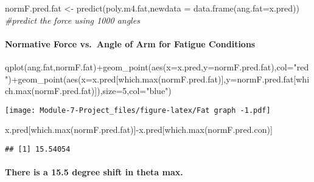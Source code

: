 \documentclass[
]{article}
\newenvironment{Shaded}{\begin{snugshade}}{\end{snugshade}}
\newcommand{\AttributeTok}[1]{\textcolor[rgb]{0.77,0.63,0.00}{#1}}
\newcommand{\CommentTok}[1]{\textcolor[rgb]{0.56,0.35,0.01}{\textit{#1}}}
\newcommand{\DecValTok}[1]{\textcolor[rgb]{0.00,0.00,0.81}{#1}}
\newcommand{\FunctionTok}[1]{\textcolor[rgb]{0.00,0.00,0.00}{#1}}
\newcommand{\NormalTok}[1]{#1}
\newcommand{\OtherTok}[1]{\textcolor[rgb]{0.56,0.35,0.01}{#1}}
\newcommand{\SpecialCharTok}[1]{\textcolor[rgb]{0.00,0.00,0.00}{#1}}
\newcommand{\StringTok}[1]{\textcolor[rgb]{0.31,0.60,0.02}{#1}}
\begin{document}
\begin{Shaded}
\begin{Highlighting}[]
\NormalTok{normF.pred.fat }\OtherTok{\textless{}{-}} \FunctionTok{predict}\NormalTok{(poly.m4.fat,}\AttributeTok{newdata =} \FunctionTok{data.frame}\NormalTok{(}\AttributeTok{ang.fat=}\NormalTok{x.pred)) }\CommentTok{\#predict the force using 1000 angles}
\end{Highlighting}
\end{Shaded}

\hypertarget{normative-force-vs.-angle-of-arm-for-fatigue-conditions}{%
\paragraph{Normative Force vs.~Angle of Arm for Fatigue
Conditions}\label{normative-force-vs.-angle-of-arm-for-fatigue-conditions}}

\begin{Shaded}
\begin{Highlighting}[]
\FunctionTok{qplot}\NormalTok{(ang.fat,normF.fat)}\SpecialCharTok{+}\FunctionTok{geom\_point}\NormalTok{(}\FunctionTok{aes}\NormalTok{(}\AttributeTok{x=}\NormalTok{x.pred,}\AttributeTok{y=}\NormalTok{normF.pred.fat),}\AttributeTok{col=}\StringTok{"red"}\NormalTok{)}\SpecialCharTok{+}\FunctionTok{geom\_point}\NormalTok{(}\FunctionTok{aes}\NormalTok{(}\AttributeTok{x=}\NormalTok{x.pred[}\FunctionTok{which.max}\NormalTok{(normF.pred.fat)],}\AttributeTok{y=}\NormalTok{normF.pred.fat[}\FunctionTok{which.max}\NormalTok{(normF.pred.fat)]),}\AttributeTok{size=}\DecValTok{5}\NormalTok{,}\AttributeTok{col=}\StringTok{"blue"}\NormalTok{)}
\end{Highlighting}
\end{Shaded}

\texttt{[image: Module-7-Project\_files/figure-latex/Fat graph -1.pdf]}

\begin{Shaded}
\begin{Highlighting}[]
\NormalTok{x.pred[}\FunctionTok{which.max}\NormalTok{(normF.pred.fat)]}\SpecialCharTok{{-}}\NormalTok{x.pred[}\FunctionTok{which.max}\NormalTok{(normF.pred.con)] }
\end{Highlighting}
\end{Shaded}

\begin{verbatim}
## [1] 15.54054
\end{verbatim}

\hypertarget{there-is-a-15.5-degree-shift-in-theta-max.}{%
\paragraph{There is a 15.5 degree shift in theta
max.}\label{there-is-a-15.5-degree-shift-in-theta-max.}}
\end{document}
